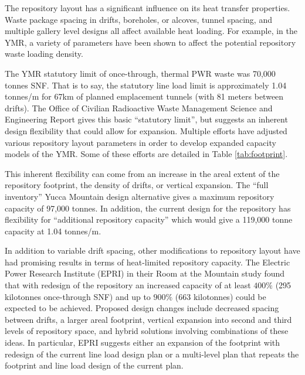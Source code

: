 The repository layout has a significant influence on its heat transfer 
properties.  Waste package spacing in drifts, boreholes, or alcoves, tunnel
spacing, and multiple gallery level designs all affect  available 
heat loading.  For example, in the \gls{YMR}, a variety of parameters have been 
shown to affect the potential repository waste loading density. 

The \gls{YMR} statutory limit of once-through, thermal PWR waste was 70,000 tonnes 
SNF.  That is to say, the statutory line load limit is approximately 1.04 tonnes/m
for 67km of planned emplacement tunnels (with 81 meters between drifts). The
Office of Civilian Radioactive Waste Management Science and Engineering Report
gives this basic ``statutory limit'', but suggests an inherent design
flexibility that could allow for expansion. Multiple efforts have adjusted 
various repository layout parameters in order to develop expanded capacity 
models of the \gls{YMR}. Some of these efforts are detailed in Table 
\ref{tab:footprint}.

 

This inherent flexibility can come from an increase in the areal extent of the 
repository footprint, the density of drifts, or vertical expansion. The  ``full inventory'' Yucca
Mountain design alternative gives a maximum repository capacity of 97,000
tonnes. In addition, the current design for the repository has flexibility for
``additional repository capacity'' which would give a 119,000 tonne capacity at
1.04 tonnes/m.\cite{doe_yucca_2002} 

In addition to variable drift spacing, other modifications to repository layout
have had promising results in terms of heat-limited repository capacity. The
Electric Power Research Institute (EPRI) in their Room at the Mountain study
found that with redesign of the repository an increased capacity of at least
$400\%$ (295 kilotonnes once-through SNF) and up to $900\%$ (663 kilotonnes) could be
expected to be achieved. Proposed design changes include decreased spacing
between drifts, a larger areal footprint, vertical expansion into second and
third levels of repository space, and hybrid solutions involving combinations
of these ideas. In particular, EPRI suggests either an expansion of the
footprint with redesign of the current line load design plan or a
multi-level plan that repeats the footprint and line load design of the current
plan\cite{kessler_room_2006}.


